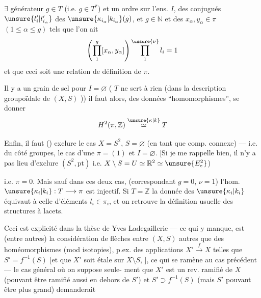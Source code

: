
$\exists$ générateur $g\in T$ (i.e. $g\in T^*$) et un ordre
sur l'ens. $I$,   des conjugués
$\unsure{l_i'|l_{i_\alpha}'}$ des $\unsure{\kappa_{i_\alpha}|k_{i_\alpha}}(g)$, et $g\in\mathbb N$ et des $x_\alpha,y_\alpha\in\pi$
$(1\leq\alpha\leq g)$ tels que l'on ait
\[
\left(\prod_1^g[x_\alpha,y_\alpha]\right)\prod_1^{\unsure{\nu}}l_i=1
\]
et que ceci soit une relation de définition
de $\pi$.

Il y a  un grain de sel pour $I=\varnothing$
( $T$ ne sert à rien  (dans la
description groupoïdale de $(X,S)$ \unsure{$\simeq$} ))
il faut alors,   des données
``homomorphismes'', se donner
\[
H^2(\pi,\mathbb Z)\overset{\unsure{\kappa|k}}{\simeq}T
\]

Enfin, il faut   
() exclure le cas $X=S^2$, $S=\varnothing$
(en tant que comp. connexe) --- i.e.
du côté groupes, le cas d'une 
$\pi=(1)$  et $I=\varnothing$.
[Si je me rappelle bien, il n'y a pas lieu
d'exclure $(S^2,\mathrm{pt})$ i.e. $X\setminus S=U\simeq\mathbb R^2\simeq\unsure{E^2_{\mathrm e}}$)


 i.e. $\pi=0$. Mais sauf dans ces
deux cas,  (correspondant
 $g=0$, $\nu=1$) l'hom. $\unsure{\kappa_i|k_i}:T\longrightarrow\pi$
est injectif. Si $T=\mathbb Z$ la donnée des $\unsure{\kappa_i|k_i}$
équivaut à celle d'éléments $l_i\in\pi_i$, et on
retrouve la définition usuelle des
structures à lacets.

Ceci est explicité dans la thèse de
Yves Ladegaillerie --- ce qui y manque, est
(entre autres) la considération de flèches
entre $(X,S)$ autres que des homéomorphismes
(mod isotopies), p.ex. des applications 
 $X'\xrightarrow{f}X$ telles que $S'=f^{-1}(S)$
[et que $X'$ soit étale sur $X\setminus S$, ],
ce qui se ramène au cas précédent
--- le cas  général où on suppose seule-
ment que $X'$ est un rev. ramifié
de $X$ (pouvant être ramifié aussi en
dehors de $S'$) et $S'\supset f^{-1}(S)$ (mais $S'$
pouvant être plus grand) demanderait

